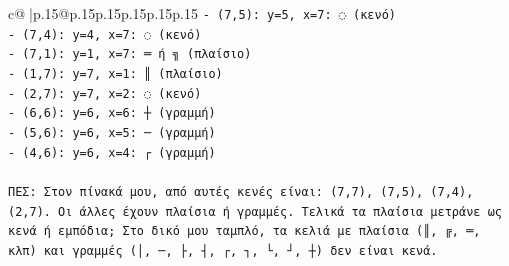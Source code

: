 \documentclass{article}
\begin{document}
{\begin{supertabular}{c@{$\;$}|p{.15\linewidth}@{}p{.15\linewidth}p{.15\linewidth}p{.15\linewidth}p{.15\linewidth}p{.15\linewidth}}
{{{\texttt{{-} (7,5): y=5, x=7: ◌ (κενό)} \\
\texttt{{-} (7,4): y=4, x=7: ◌ (κενό)} \\
\texttt{{-} (7,1): y=1, x=7: ═ ή ╗ (πλαίσιο)} \\
\texttt{{-} (1,7): y=7, x=1: ║ (πλαίσιο)} \\
\texttt{{-} (2,7): y=7, x=2: ◌ (κενό)} \\
\texttt{{-} (6,6): y=6, x=6: ┼ (γραμμή)} \\
\texttt{{-} (5,6): y=6, x=5: ─ (γραμμή)} \\
\texttt{{-} (4,6): y=6, x=4: ┌ (γραμμή)} \\
\\ 
\texttt{ΠΕΣ: Στον πίνακά μου, από αυτές κενές είναι: (7,7), (7,5), (7,4), (2,7). Οι άλλες έχουν πλαίσια ή γραμμές. Τελικά τα πλαίσια μετράνε ως κενά ή εμπόδια; Στο δικό μου ταμπλό, τα κελιά με πλαίσια (║, ╔, ═, κλπ) και γραμμές (│, ─, ├, ┤, ┌, ┐, └, ┘, ┼) δεν είναι κενά.} \\
            }
        }
    }
     \\ \\


\end{supertabular}}
\end{document}
